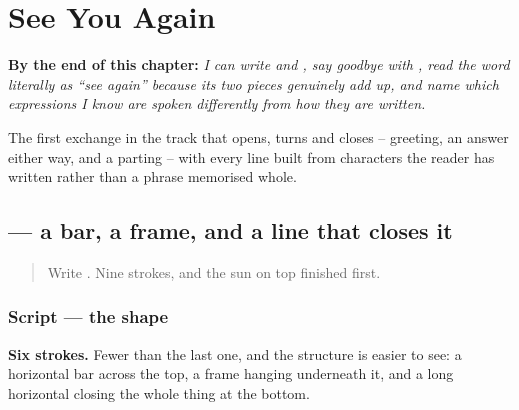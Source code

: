 
\chapter{See You Again}
\label{ch:zh-zaijian}

\begin{chapteropening}
\textbf{By the end of this chapter:} \emph{I can write  and , say goodbye with , read the word literally as \textquotedblleft{}see again\textquotedblright{} because its two pieces genuinely add up, and name which expressions I know are spoken differently from how they are written.}

The first exchange in the track that opens, turns and closes -- greeting, an answer either way, and a parting -- with every line built from characters the reader has written rather than a phrase memorised whole.
\end{chapteropening}

\section[\texorpdfstring{\zh{再} (zài)}{再 (zài)}]{ — a bar, a frame, and a line that closes it}

\label{lesson:ZH-W06-zai}



\begin{quote}
Write . Nine strokes, and the sun on top finished first.
\end{quote}

\subsection*{Script — the shape}

\begin{quote}
\end{quote}

\textbf{Six strokes.} Fewer than the last one, and the structure is easier to see: a horizontal bar across the top, a frame hanging underneath it, and a long horizontal closing the whole thing at the bottom.

